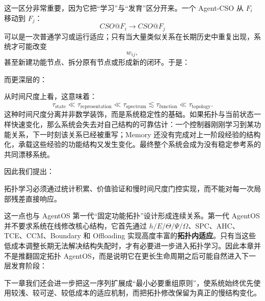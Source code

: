 这一区分非常重要，因为它把``学习''与``发育''区分开来。一个 Agent-CSO 从 $F_i$ 移动到 $F_j$：
\[
CSO@F_i
\rightarrow
CSO@F_j
\]
可以是一次普通学习或运行适应；只有当大量类似关系在长期历史中重复出现，系统才可能改变
\[
w_{ij},
\]
甚至新建功能节点、拆分原有节点或形成新的闭环。于是：
\begin{statementbox}
\centering
{}
\end{statementbox}
而更深层的：
\begin{statementbox}
\centering
{}
\end{statementbox}

从时间尺度上看，这意味着：
\[
\tau_{\mathrm{state}}
\ll
\tau_{\mathrm{representation}}
\ll
\tau_{\mathrm{spectrum}}
\lesssim
\tau_{\mathrm{function}}
\ll
\tau_{\mathrm{topology}}.
\]
这种时间尺度分离并非数学装饰，而是系统稳定性的基础。如果拓扑与当前状态一样快速变化，那么系统会失去对自己结构的可靠估计：一个控制器刚刚学习到某功能关系，下一时刻该关系已经被重写；Memory 还没有完成对上一阶段经验的结构化，承载这些经验的功能结构又发生变化。最终整个系统会成为没有稳定参考系的共同漂移系统。

因此我们提出：
\begin{statementbox}
\centering
{}
\end{statementbox}

拓扑学习必须通过统计积累、价值验证和慢时间尺度门控实现，而不能对每一次局部残差直接响应。

这一点也与 AgentOS 第一代``固定功能拓扑''设计形成连续关系。第一代 AgentOS 并不要求系统在线修改核心结构，它首先通过 $h/E/\Theta/\Psi/\Omega$、SPC、AHC、TCE、CCM、Boundary 和 Offloading 实现高度丰富的\textbf{拓扑内适应}。只有当这些低成本调整长期无法解决结构失配时，才有必要进一步进入拓扑学习。因此本章并不是推翻固定拓扑 AgentOS，而是说明它在更长生命周期之后可能自然进入下一层发育阶段：
\begin{statementbox}
\centering
{}
\end{statementbox}

下一章我们还会进一步把这一序列扩展成``最小必要重组原则''，使系统始终优先使用较浅、较可逆、较低成本的适应机制，而把拓扑修改保留为真正的慢结构变化。


